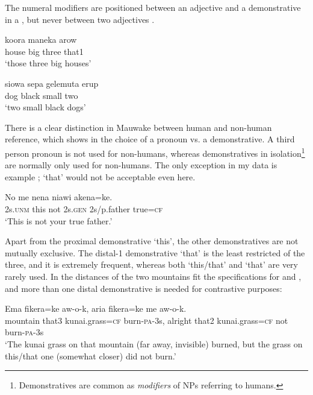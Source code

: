 The numeral modifiers are positioned between an adjective and a demonstrative in a  , but never between two adjectives .

\ea%
\label{ex:3:x631}
\gll koora maneka arow  \\
house big three that1\\
\glt`those three big houses'
\z

\ea%
\label{ex:3:x632}
\gll siowa sepa gelemuta erup \\
dog black small two\\
\glt`two small black dogs'
\z

There is a clear distinction in Mauwake between human and non-human reference, which shows in the choice of a pronoun vs. a demonstrative. A third person pronoun is not used for non-humans, whereas demonstratives in isolation\footnote{Demonstratives are common as \textit{modifiers} of NPs referring to humans.} are normally only used for non-humans. The only exception in my data is example ;  `that' would not be acceptable even here.

\ea%
\label{ex:3:x633}
\gll No{\footnotemark}  me nena niawi akena=ke. \\
2s.\textsc{unm} this not 2s.\textsc{gen} 2s/p.father true=\textsc{cf}\\
\glt`This is not your true father.'
\z


Apart from the proximal demonstrative  `this', the other demonstratives are not mutually exclusive. The distal-1 demonstrative  `that' is the least restricted of the three, and it is extremely frequent, whereas both  `this/that' and  `that' are very rarely used. In  the distances of the two mountains fit the specifications for  and  , and more than one distal demonstrative is needed for contrastive purposes:

\ea%
\label{ex:3:x1749}
\gll Ema  fikera=ke aw-o-k, aria  fikera=ke me aw-o-k.\\
mountain that3 kunai.grass=\textsc{cf} burn-\textsc{pa}-3s, alright that2 kunai.grass=\textsc{cf} not burn-\textsc{pa}-3s\\
\glt`The kunai grass on that mountain (far away, invisible) burned, but the grass on this/that one (somewhat closer) did not burn.'
\z

